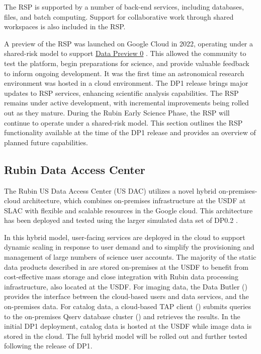 The \gls{RSP} is supported by a number of back-end services, including databases, files, and batch computing.
Support for collaborative work through shared workspaces is also included in the \gls{RSP}.

A preview of the \gls{RSP} was launched on Google Cloud in 2022, operating under a shared-risk model to support \href{https://dp0.lsst.io/}{Data Preview 0} \citep{2024ASPC..535..227O}. This allowed the community to test the platform, begin preparations  for science, and provide valuable feedback to inform ongoing development.
It was the first time an astronomical research environment was hosted in a \gls{cloud} environment.
The DP1 release brings major updates to \gls{RSP} services, enhancing scientific analysis capabilities.
The \gls{RSP} remains under active development, with incremental improvements being rolled out as they mature.
During the Rubin Early Science Phase, the \gls{RSP} will continue to operate under a shared-risk model.
This section outlines the RSP functionality available at the time of the DP1 release and provides an overview of planned future capabilities.


\subsection{Rubin Data Access Center}
\label{ssec:usdac}
The Rubin US Data Access Center (US DAC) utilizes a novel hybrid on-premises-\gls{cloud} architecture, which combines on-premises infrastructure at the \gls{USDF} at SLAC with flexible and scalable resources in the Google \gls{cloud}.
This architecture has been deployed and tested using the larger simulated data set of DP0.2 \citep{2024SPIE13101E..2BO}.

In this hybrid model, user-facing services are deployed in the \gls{cloud} to support
dynamic scaling in response to user demand and to simplify the provisioning and management of large numbers of science user accounts.
The majority of the static data products described in  are stored on-premises at the \gls{USDF} to benefit from cost-effective mass storage and close integration with Rubin data processing infrastructure, also located at the \gls{USDF}.
For imaging data, the Data Butler () provides the interface between the \gls{cloud}-based users and data services, and the on-premises data.
For catalog data, a \gls{cloud}-based \gls{TAP} client () submits queries to the on-premises \gls{Qserv} database cluster () and retrieves the results.
In the initial DP1 deployment, catalog data is hosted at the \gls{USDF} while image data is stored in the cloud.
The full hybrid model will be rolled out and further tested following the release of \gls{DP1}.

